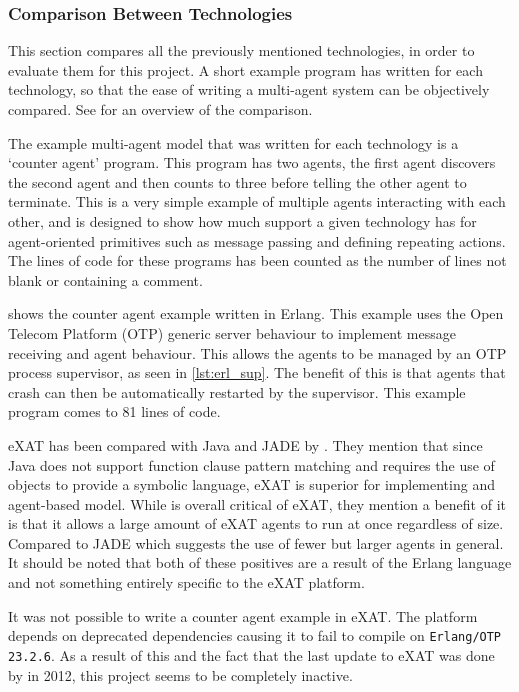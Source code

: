 \subsubsection{Comparison Between Technologies}

This section compares all the previously mentioned technologies, in order to evaluate them for this project.
A short example program has written for each technology, so that the ease of writing a multi-agent system can be objectively compared.
See  for an overview of the comparison.

The example multi-agent model that was written for each technology is a `counter agent' program.
This program has two agents, the first agent discovers the second agent and then counts to three before telling the other agent to terminate.
This is a very simple example of multiple agents interacting with each other, and is designed to show how much support a given technology has for agent-oriented primitives such as message passing and defining repeating actions.
The lines of code for these programs has been counted as the number of lines not blank or containing a comment.

 shows the counter agent example written in Erlang.
This example uses the Open Telecom Platform (OTP) generic server behaviour to implement message receiving and agent behaviour.
This allows the agents to be managed by an OTP process supervisor, as seen in \cref{lst:erl_sup}.
The benefit of this is that agents that crash can then be automatically restarted by the supervisor.
This example program comes to 81 lines of code.

eXAT has been compared with Java and JADE by .
They mention that since Java does not support function clause pattern matching and requires the use of objects to provide a symbolic language, eXAT is superior for implementing and agent-based model.
While  is overall critical of eXAT, they mention a benefit of it is that it allows a large amount of eXAT agents to run at once regardless of size.
Compared to JADE which suggests the use of fewer but larger agents in general.
It should be noted that both of these positives are a result of the Erlang language and not something entirely specific to the eXAT platform.

It was not possible to write a counter agent example in eXAT\@.
The platform depends on deprecated dependencies causing it to fail to compile on \verb|Erlang/OTP 23.2.6|.
As a result of this and the fact that the last update to eXAT was done by  in 2012, this project seems to be completely inactive.

